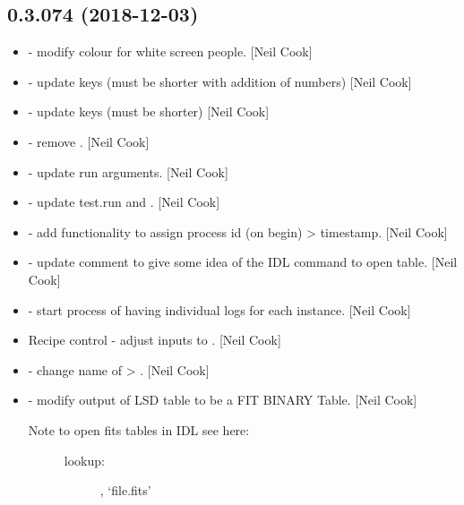 \documentclass[a4paper,10pt,english]{report}
\begin{document}
\subsection{0.3.074 (2018-12-03)}
\label{\detokenize{misc/changelog:id248}}\begin{itemize}
\item {} 
 - modify colour for white screen people. {[}Neil Cook{]}

\item {} 
 - update keys (must be shorter with addition of
numbers) {[}Neil Cook{]}

\item {} 
 - update keys (must be shorter) {[}Neil Cook{]}

\item {} 
 - remove . {[}Neil Cook{]}

\item {} 
 - update run arguments. {[}Neil Cook{]}

\item {} 
 - update test.run and . {[}Neil Cook{]}

\item {} 
 - add functionality to assign process id (on begin)
\textendash{}\textgreater{} timestamp. {[}Neil Cook{]}

\item {} 
 - update comment to give some idea of the IDL command
to open table. {[}Neil Cook{]}

\item {} 
 - start process of having individual logs for each
instance. {[}Neil Cook{]}

\item {} 
Recipe control - adjust inputs to . {[}Neil Cook{]}

\item {} 
 - change name of  \textendash{}\textgreater{}
. {[}Neil Cook{]}

\item {} 
 - modify output of LSD table to be a FIT BINARY Table.
{[}Neil Cook{]}
\begin{description}
\item[{Note to open fits tables in IDL see here:}] \leavevmode
{}
\begin{description}
\item[{lookup:}] \leavevmode
{}, ‘file.fits’


\end{description}
\end{description}
\end{itemize}
\end{document}
